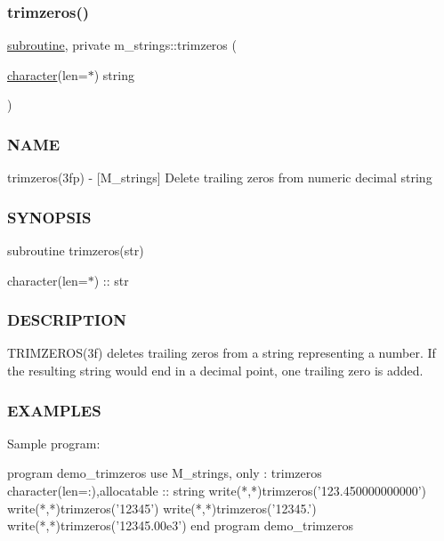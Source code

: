 \subsubsection{\texorpdfstring{trimzeros()}{trimzeros()}}
{\footnotesize\ttfamily \hyperlink{M__stopwatch_83_8txt_acfbcff50169d691ff02d4a123ed70482}{subroutine}, private m\+\_\+strings\+::trimzeros (\begin{DoxyParamCaption}\item[{\hyperlink{option__stopwatch_83_8txt_abd4b21fbbd175834027b5224bfe97e66}{character}(len=$\ast$)}]{string }\end{DoxyParamCaption})\hspace{0.3cm}{\ttfamily [private]}}



\subsubsection*{N\+A\+ME}

trimzeros(3fp) -\/ \mbox{[}M\+\_\+strings\mbox{]} Delete trailing zeros from numeric decimal string \subsubsection*{S\+Y\+N\+O\+P\+S\+IS}

subroutine trimzeros(str)

character(len=$\ast$) \+:\+: str \subsubsection*{D\+E\+S\+C\+R\+I\+P\+T\+I\+ON}

T\+R\+I\+M\+Z\+E\+R\+O\+S(3f) deletes trailing zeros from a string representing a number. If the resulting string would end in a decimal point, one trailing zero is added. \subsubsection*{E\+X\+A\+M\+P\+L\+ES}

\begin{DoxyVerb}Sample program:

   program demo_trimzeros
   use M_strings, only : trimzeros
   character(len=:),allocatable :: string
   write(*,*)trimzeros('123.450000000000')
   write(*,*)trimzeros('12345')
   write(*,*)trimzeros('12345.')
   write(*,*)trimzeros('12345.00e3')
   end program demo_trimzeros \end{DoxyVerb}
 \mbox{\label{namespacem__strings_a0953ac5c4d31339fdd8ec3acc9c3c915}} 

